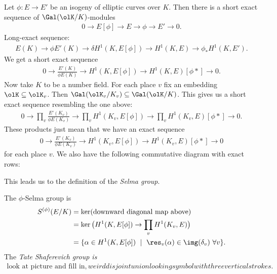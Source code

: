 Let $\phi:E\to E'$ be an isogeny of elliptic curves over $K$. Then there is a short exact sequence of $\Gal(\olK/K)$-modules
\begin{align*}
	0 \to E[\phi] \to E \to{\phi} \to E' \to 0.
\end{align*}
Long-exact sequence:
\begin{align*}
	E(K) \to{\phi} E'(K) \to{\delta} H^1(K,E[\phi]) \to H^1(K,E) \to{\phi_*} H^1(K,E').
\end{align*}
We get a short exact sequence
\begin{align*}
	0 \to \frac{E'(K)}{\phi E(K)} \to H^1(K,E[\phi]) \to H^1(K,E)[\phi*] \to 0.
\end{align*}
Now take $K$ to be a number field. For each place $v$ fix an embedding $\olK \subseteq \olK_v$. Then $\Gal(\olK_v/K_v) \subseteq \Gal(\olK/K)$. This gives us a short exact sequence resembling the one above:
\begin{align*}
	0 \to \prod_v\frac{E'(K_v)}{\phi E(K_v)} \to \prod_vH^1(K_v,E[\phi]) \to \prod_{ v }H^1(K_v,E)[\phi*] \to 0.
\end{align*}
These products just mean that we have an exact sequence
\begin{align*}
	0 \to \frac{E'(K_v)}{\phi E(K_v)} \to H^1(K_v,E[\phi]) \to H^1(K_v,E)[\phi*] \to 0
\end{align*}
for each place $v$. We also have the following commutative diagram with exact rows:
\begin{center}
\end{center}
This leads us to the definition of the \emph{Selma group}.
\begin{defn}\label{defn:selma-group}
	The $\phi$-Selma group is
	\begin{align*}
		S^{(\phi)}(E/K) &= \ker(\text{downward diagonal map above}) \\
						&= \ker\big(H^1(K,E[\phi])\to \prod_v H^1(K_v,E)\big) \\
						&= \{ \alpha \in H^1(K,E[\phi]) ~\mid~ \res_v(\alpha) \in \img(\delta_v) ~ \forall v\}.
	\end{align*}
	The \emph{Tate Shaferevich group is }
	\begin{align*}
		\text{look at picture and fill in}, weird disjoint union looking symbol with three vertical strokes.
	\end{align*}
\end{defn}

